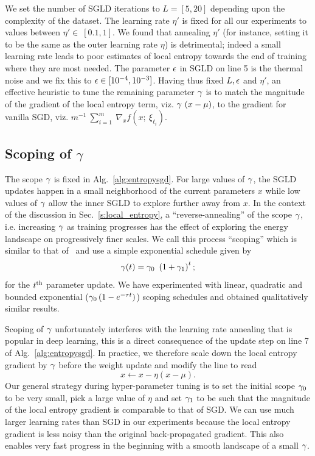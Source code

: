 \documentclass[10pt]{article}
\begin{document}
We set the number of SGLD iterations to $L = [5, 20]$ depending upon the complexity of the dataset. The learning rate $\eta'$ is fixed for all our experiments to values between $\eta' \in\ [0.1, 1]$. We found that annealing $\eta'$ (for instance, setting it to be the same as the outer learning rate $\eta$) is detrimental; indeed a small learning rate leads to poor estimates of local entropy towards the end of training where they are most needed. The parameter $\epsilon$ in SGLD on line 5 is the thermal noise and we fix this to $\epsilon \in [10^{-4},10^{-3}]$. Having thus fixed $L, \epsilon$ and $\eta'$, an effective heuristic to tune the remaining parameter $\gamma$ is to match the magnitude of the gradient of the local entropy term, viz. $\g\ (x - \mu)$, to the gradient for vanilla SGD, viz. $m^{-1}\ \sum_{i=1}^m\ \nabla_x f(x;\ \xi_{\ell_i})$.

\subsection{Scoping of $\gamma$}
\label{s:scoping}

The scope $\gamma$ is fixed in Alg.~\ref{alg:entropysgd}. For large values of $\gamma$, the SGLD updates happen in a small neighborhood of the current parameters $x$ while low values of $\gamma$ allow the inner SGLD to explore further away from $x$. In the context of the discussion in Sec.~\ref{s:local_entropy}, a ``reverse-annealing'' of the scope $\gamma$, i.e. increasing $\gamma$ as training progresses has the effect of exploring the energy landscape on progressively finer scales. We call this process ``scoping'' which is similar to that of~\citet{baldassi2016unreasonable} and use a simple exponential schedule given by
$$
    \g(t) = \g_0\ \rbrac{1 + \g_1}^t;
$$
for the $t^{\mathrm{th}}$ parameter update. We have experimented with linear, quadratic and bounded exponential ($\gamma_0 \left(1 - e^{-\tau t}\right)$) scoping schedules and obtained qualitatively similar results.

Scoping of $\gamma$ unfortunately interferes with the learning rate annealing that is popular in deep learning, this is a direct consequence of the update step on line 7 of Alg.~\ref{alg:entropysgd}. In practice, we therefore scale down the local entropy gradient by $\gamma$ before the weight update and modify the line to read
$$
    x \leftarrow x - \eta (x - \mu).
$$
Our general strategy during hyper-parameter tuning is to set the initial scope $\gamma_0$ to be very small, pick a large value of $\eta$ and set $\gamma_1$ to be such that the magnitude of the local entropy gradient is comparable to that of SGD. We can use much larger learning rates than SGD in our experiments because the local entropy gradient is less noisy than the original back-propagated gradient. This also enables very fast progress in the beginning with a smooth landscape of a small $\gamma$.
\end{document}
